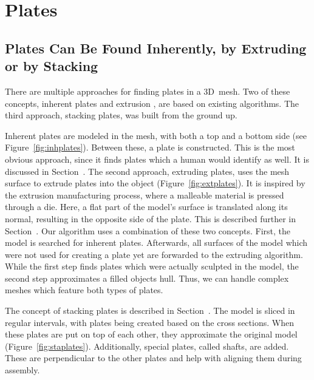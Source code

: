 \documentclass[../ClassicThesis.tex]{subfiles}
\begin{document}
\chapter{Plates}\label{ch:plates}

\section{Plates Can Be Found Inherently, by Extruding or by Stacking}

There are multiple approaches for finding plates in a 3D~mesh. Two of these concepts, inherent plates \cite[p.~32]{master-thesis} and extrusion \cite[p.~28]{master-thesis}, are based on existing algorithms. The third approach, stacking plates, was built from the ground up.

Inherent plates are modeled in the mesh, with both a top and a bottom side (see Figure~\ref{fig:inhplates}). Between these, a plate is constructed. This is the most obvious approach, since it finds plates which a human would identify as well. It is discussed in Section~. The second approach, extruding plates, uses the mesh surface to extrude plates into the object (Figure~\ref{fig:extplates}). It is inspired by the extrusion manufacturing process, where a malleable material is pressed through a die. Here, a flat part of the model's surface is translated along its normal, resulting in the opposite side of the plate. This is described further in Section~. Our algorithm uses a combination of these two concepts. First, the model is searched for inherent plates. Afterwards, all surfaces of the model which were not used for creating a plate yet are forwarded to the extruding algorithm. While the first step finds plates which were actually sculpted in the model, the second step approximates a filled objects hull. Thus, we can handle complex meshes which feature both types of plates. 

The concept of stacking plates is described in Section~. The model is sliced in regular intervals, with plates being created based on the cross sections. When these plates are put on top of each other, they approximate the original model (Figure~\ref{fig:staplates}). Additionally, special plates, called shafts, are added. These are perpendicular to the other plates and help with aligning them during assembly.
\end{document}
